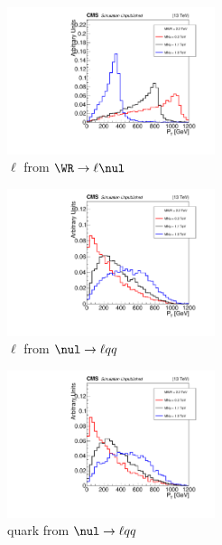 \begin{figure}
	\centering
	\begin{subfigure}[t]{2.4in}
		\centering
		\includegraphics[width=2.4in]{figures/ptGenLeptFromFstHvyPtcl_MWR_2200_several_MNu_private.pdf}
		\caption{$\ell$ from $\WR \rightarrow \ell\nul$}\label{fig:wrLeptQrkPtsVarMNua}
	\end{subfigure}
	\thickspace
	\begin{subfigure}[t]{2.4in}
		\centering
		\includegraphics[width=2.4in]{figures/ptGenLeptFromScdHvyPtcl_MWR_2200_several_MNu_private.pdf}
		\caption{$\ell$ from $\nul \rightarrow \ell qq$}\label{fig:wrLeptQrkPtsVarMNub}
	\end{subfigure}
	\newline
	\newline
	\newline
	\newline
	\begin{subfigure}[t]{2.4in}
		\centering
		\includegraphics[width=2.4in]{figures/ptGenQuarkOneFromScdHvyPtcl_MWR_2200_several_MNu_private.pdf}
		\caption{quark from $\nul \rightarrow \ell qq$}\label{fig:wrLeptQrkPtsVarMNuc}
	\end{subfigure}
	\thickspace
	\begin{subfigure}[t]{2.4in}

\end{subfigure}
\end{figure}
